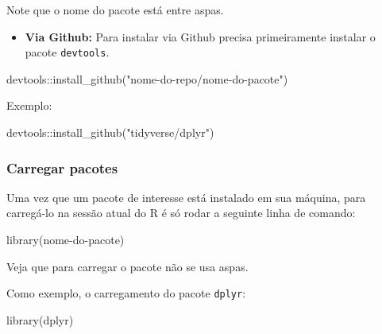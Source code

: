 \documentclass[
  letterpaper,
  DIV=11,
  numbers=noendperiod]{scrreprt}
\newenvironment{Shaded}{\begin{snugshade}}{\end{snugshade}}
\newcommand{\FunctionTok}[1]{\textcolor[rgb]{0.28,0.35,0.67}{#1}}
\newcommand{\NormalTok}[1]{\textcolor[rgb]{0.00,0.23,0.31}{#1}}
\newcommand{\SpecialCharTok}[1]{\textcolor[rgb]{0.37,0.37,0.37}{#1}}
\newcommand{\StringTok}[1]{\textcolor[rgb]{0.13,0.47,0.30}{#1}}
\providecommand{\tightlist}{%
  \setlength{\itemsep}{0pt}\setlength{\parskip}{0pt}}\usepackage{longtable,booktabs,array}
\begin{document}
Note que o nome do pacote está entre aspas.

\begin{itemize}
\tightlist
\item
  \textbf{Via Github:} Para instalar via Github precisa primeiramente
  instalar o pacote \texttt{devtools}.
\end{itemize}

\begin{Shaded}
\begin{Highlighting}[]
\NormalTok{devtools}\SpecialCharTok{::}\FunctionTok{install\_github}\NormalTok{(}\StringTok{"nome{-}do{-}repo/nome{-}do{-}pacote"}\NormalTok{)}
\end{Highlighting}
\end{Shaded}

Exemplo:

\begin{Shaded}
\begin{Highlighting}[]
\NormalTok{devtools}\SpecialCharTok{::}\FunctionTok{install\_github}\NormalTok{(}\StringTok{"tidyverse/dplyr"}\NormalTok{)}
\end{Highlighting}
\end{Shaded}

\hypertarget{carregar-pacotes}{%
\subsubsection{Carregar pacotes}\label{carregar-pacotes}}

Uma vez que um pacote de interesse está instalado em sua máquina, para
carregá-lo na sessão atual do R é só rodar a seguinte linha de comando:

\begin{Shaded}
\begin{Highlighting}[]
\FunctionTok{library}\NormalTok{(nome}\SpecialCharTok{{-}}\NormalTok{do}\SpecialCharTok{{-}}\NormalTok{pacote)}
\end{Highlighting}
\end{Shaded}

Veja que para carregar o pacote não se usa aspas.

Como exemplo, o carregamento do pacote \texttt{dplyr}:

\begin{Shaded}
\begin{Highlighting}[]
\FunctionTok{library}\NormalTok{(dplyr)}
\end{Highlighting}
\end{Shaded}
\end{document}
